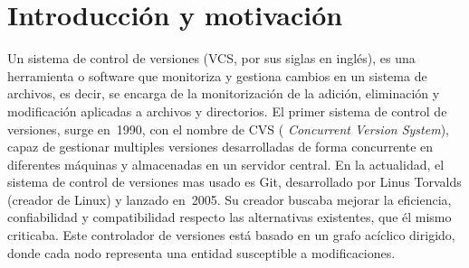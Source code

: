 \chapter{Introducción y motivación\label{01intro}}






Un sistema de control de versiones (VCS, por sus siglas en inglés), es una
herramienta o software que monitoriza y gestiona cambios en un sistema de
archivos, es decir, se encarga de la monitorización de la adición,
eliminación y modificación aplicadas a archivos y directorios. El primer
sistema de control de versiones, surge en~1990, con el nombre de CVS ({\em
  Concurrent Version System}), capaz de gestionar multiples versiones
desarrolladas de forma concurrente en diferentes máquinas y almacenadas en
un servidor central. En la actualidad, el sistema de control de versiones
mas usado es Git\cite{git}, desarrollado por Linus Torvalds (creador de
Linux) y lanzado en~2005. Su creador buscaba mejorar la eficiencia,
confiabilidad y compatibilidad respecto las alternativas existentes, que él
mismo criticaba. Este controlador de versiones está basado en un grafo
acíclico dirigido, donde cada nodo representa una entidad susceptible a
modificaciones.

